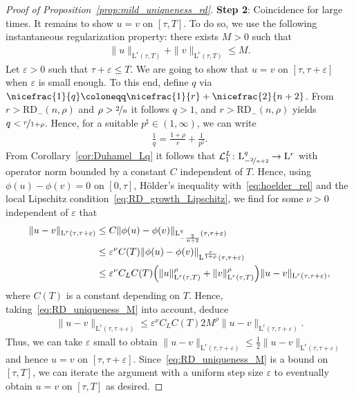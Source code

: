\documentclass[11pt, leqno]{amsart}
\theoremstyle{definition}
\renewcommand{\L}{\mathrm{L}}
\newcommand{\Soll}{\mathcal{L}}
\newcommand{\eps}{\varepsilon}
\newcommand{\RD}{\mathrm{RD}}
\begin{document}
\begin{proof}[Proof of Proposition~\ref{prop:mild_uniqneness_rd}]
		\textbf{Step 2}: Coincidence for large times. It remains to show $u = v$ on $[\tau,T]$. To do so, we use the following instantaneous regularization property: there exists $M > 0$ such that
		\begin{align}
			\label{eq:RD_uniqueness_M}
			\| u \|_{\L^r(\tau,T)} + \| v \|_{\L^r(\tau,T)} \leq M.
		\end{align}
		Let $\eps > 0$ such that $\tau + \eps \leq T$.
		We are going to show that $u = v$ on $[\tau, \tau + \eps]$ when $\eps$ is small enough.
		To this end, define $q$ via $\nicefrac{1}{q} \coloneqq \nicefrac{1}{r} + \nicefrac{2}{n+2}$. From $r > \RD_{-}(n,\rho)$ and $\rho > \nicefrac{2}{n}$ it follows $q > 1$, and $r > \RD_{-}(n,\rho)$ yields $q < \nicefrac{r}{1+\rho}$. Hence, for a suitable $p^\sharp\in (1,\infty)$, we can write
		\begin{align}
			\label{eq:hoelder_rel}
			\frac{1}{q} = \frac{1 + \rho}{r} + \frac{1}{p^\sharp}.
		\end{align}
		From Corollary~\ref{cor:Duhamel_Lq} it follows that $\Soll^L_1 \colon \L^q_{-\nicefrac{2}{n+2}} \to \L^r$ with operator norm bounded by a constant $C$ independent of $T$. Hence, using $\phi(u) - \phi(v) = 0$ on $[0,\tau]$, Hölder's inequality with~\eqref{eq:hoelder_rel} and the local Lipschitz condition~\eqref{eq:RD_growth_Lipschitz}, we find for some $\nu > 0$ independent of $\eps$ that
		\begin{align}
			\| u-v \|_{\L^r(\tau, \tau + \eps)} &\leq C \| \phi(u) - \phi(v) \|_{\L^q_{-\frac{2}{n+2}}(\tau, \tau + \eps)} \\
			&\leq \eps^\nu C(T) \| \phi(u) - \phi(v) \|_{\L^\frac{r}{1+\rho}(\tau, \tau + \eps)} \\
			&\leq \eps^\nu C_L C(T) \Bigl( \| u \|_{\L^r(\tau, T)}^\rho + \| v \|_{\L^r(\tau, T)}^\rho \Bigr) \| u-v \|_{\L^r(\tau, \tau + \eps)},
		\end{align}
		where $C(T)$ is a constant depending on $T$.
		Hence, taking~\eqref{eq:RD_uniqueness_M} into account, deduce
		\begin{align}
			\| u-v \|_{\L^r(\tau, \tau + \eps)} \leq \eps^\nu C_L C(T) 2 M^\rho \| u-v \|_{\L^r(\tau, \tau + \eps)}.
		\end{align}
		Thus, we can take $\eps$ small to obtain
		$\| u-v \|_{\L^r(\tau, \tau + \eps)} \leq \frac{1}{2} \| u-v \|_{\L^r(\tau, \tau + \eps)}$ and hence $u = v$ on $[\tau, \tau + \eps]$. Since~\eqref{eq:RD_uniqueness_M} is a bound on $[\tau, T]$, we can iterate the argument with a uniform step size $\eps$ to eventually obtain $u = v$ on $[\tau, T]$ as desired.
	\end{proof}
\end{document}
